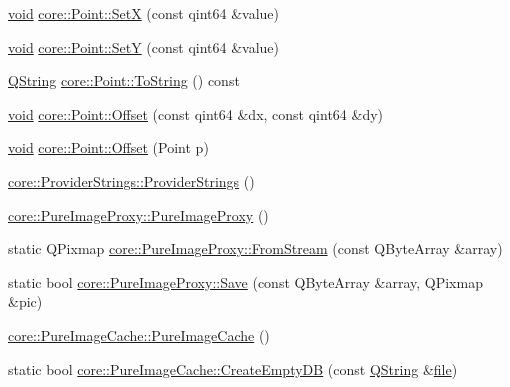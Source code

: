 \begin{DoxyCompactItemize}
\item 
\hyperlink{group___u_a_v_objects_plugin_ga444cf2ff3f0ecbe028adce838d373f5c}{void} \hyperlink{group___o_p_map_widget_ga3dea470d6276c4049e2aa39b14d637e7}{core\-::\-Point\-::\-Set\-X} (const qint64 \&value)
\item 
\hyperlink{group___u_a_v_objects_plugin_ga444cf2ff3f0ecbe028adce838d373f5c}{void} \hyperlink{group___o_p_map_widget_gae987195d2da22e1c8e4ca161fe9a2269}{core\-::\-Point\-::\-Set\-Y} (const qint64 \&value)
\item 
\hyperlink{group___u_a_v_objects_plugin_gab9d252f49c333c94a72f97ce3105a32d}{\-Q\-String} \hyperlink{group___o_p_map_widget_gabfd5368c170cc03b85baf6c32c56f11a}{core\-::\-Point\-::\-To\-String} () const 
\item 
\hyperlink{group___u_a_v_objects_plugin_ga444cf2ff3f0ecbe028adce838d373f5c}{void} \hyperlink{group___o_p_map_widget_ga6ffa19db824186dac9bac22ebf314e3e}{core\-::\-Point\-::\-Offset} (const qint64 \&dx, const qint64 \&dy)
\item 
\hyperlink{group___u_a_v_objects_plugin_ga444cf2ff3f0ecbe028adce838d373f5c}{void} \hyperlink{group___o_p_map_widget_ga31f14855ca1e292676db909b2b0f1c11}{core\-::\-Point\-::\-Offset} (\-Point p)
\item 
\hyperlink{group___o_p_map_widget_ga1ecf05c742cf2e3d35cffadb55e73ba2}{core\-::\-Provider\-Strings\-::\-Provider\-Strings} ()
\item 
\hyperlink{group___o_p_map_widget_ga6c0425d3ca7f1f64fcfa477e419df111}{core\-::\-Pure\-Image\-Proxy\-::\-Pure\-Image\-Proxy} ()
\item 
static \-Q\-Pixmap \hyperlink{group___o_p_map_widget_gaadda67144242dbc72eecd8bf5e4ad935}{core\-::\-Pure\-Image\-Proxy\-::\-From\-Stream} (const \-Q\-Byte\-Array \&array)
\item 
static bool \hyperlink{group___o_p_map_widget_ga90956060e74b0bed45a12b6b99995c82}{core\-::\-Pure\-Image\-Proxy\-::\-Save} (const \-Q\-Byte\-Array \&array, \-Q\-Pixmap \&pic)
\item 
\hyperlink{group___o_p_map_widget_ga28510761dcb972fdc54b26b91f199770}{core\-::\-Pure\-Image\-Cache\-::\-Pure\-Image\-Cache} ()
\item 
static bool \hyperlink{group___o_p_map_widget_gac23ecdf49009e55e9e7358c990f32bfa}{core\-::\-Pure\-Image\-Cache\-::\-Create\-Empty\-D\-B} (const \hyperlink{group___u_a_v_objects_plugin_gab9d252f49c333c94a72f97ce3105a32d}{\-Q\-String} \&\hyperlink{uavobjecttemplate_8m_a97c04efa65bcf0928abf9260bc5cbf46}{file})
\item 

\end{DoxyCompactItemize}
